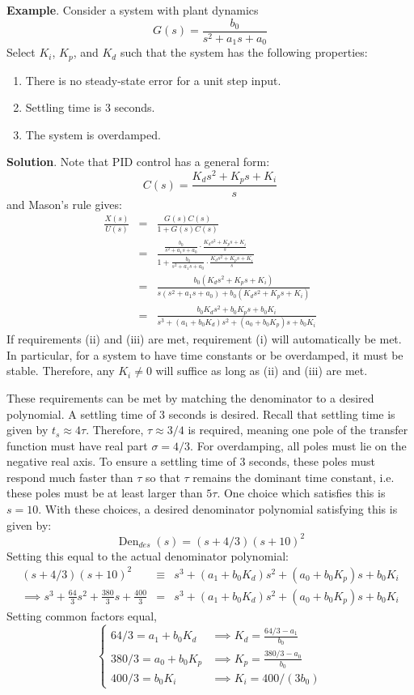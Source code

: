 \begin{framed}
    \textbf{Example}. Consider a system with plant dynamics \[G(s) = \frac{b_0}{s^2+a_1 s + a_0}\] Select $K_i$, $K_p$, and $K_d$ such that the system has the following properties: \vspace{-1em}\begin{enumerate}
        \item[(i)] There is no steady-state error for a unit step input.
        \item[(ii)] Settling time is $3$ seconds.
        \item[(iii)] The system is overdamped.
    \end{enumerate}\vspace{-1em}
    \textbf{Solution}. Note that PID control has a general form: \[C(s) = \frac{K_ds^2+K_p s + K_i}{s}\] and Mason's rule gives: \begin{eqnarray*}
        \frac{X(s)}{U(s)} &=& \frac{G(s)C(s)}{1+G(s)C(s)}\\
        &=& \frac{\frac{b_0}{s^2+a_1s+a_0}\cdot \frac{K_ds^2+K_ps+K_i}{s}}{1+\frac{b_0}{s^2+a_1s+a_0}\cdot \frac{K_ds^2+K_ps+K_i}{s}}\\
        &=& \frac{b_0(K_ds^2+K_ps+K_i)}{s(s^2+a_1s+a_0) + b_0(K_ds^2+K_ps+K_i)}\\
        &=& \frac{b_0K_ds^2+b_0K_ps+b_0K_i}{s^3+(a_1+b_0K_d)s^2+(a_0+b_0K_p)s+b_0K_i}
    \end{eqnarray*}
    If requirements (ii) and (iii) are met, requirement (i) will automatically be met. In particular, for a system to have time constants or be overdamped, it must be stable. Therefore, any $K_i\neq 0$ will suffice as long as (ii) and (iii) are met.

    These requirements can be met by matching the denominator to a desired polynomial. A settling time of $3$ seconds is desired. Recall that settling time is given by $t_s \approx 4\tau$. Therefore, $\tau \approx 3/4$ is required, meaning one pole of the transfer function must have real part $\sigma = 4/3$. For overdamping, all poles must lie on the negative real axis. To ensure a settling time of $3$ seconds, these poles must respond much faster than $\tau$ so that $\tau$ remains the dominant time constant, i.e. these poles must be at least larger than $5\tau$. One choice which satisfies this is $s=10$. With these choices, a desired denominator polynomial satisfying this is given by: \[\operatorname{Den}_{des}(s) = (s+4/3)(s+10)^2\] Setting this equal to the actual denominator polynomial: \begin{eqnarray*}
        (s+4/3)(s+10)^2 &\equiv& s^3+(a_1+b_0K_d)s^2 + (a_0+b_0K_p)s + b_0K_i\\
        \implies s^3+\frac{64}{3}s^2+\frac{380}{3}s+\frac{400}{3} &=& s^3+(a_1+b_0K_d)s^2+(a_0+b_0K_p)s+b_0K_i
    \end{eqnarray*} Setting common factors equal, \[\begin{cases}
        64/3 = a_1+b_0K_d &\implies K_d = \frac{64/3 - a_1}{b_0}\\
        380/3 = a_0+b_0K_p &\implies K_p = \frac{380/3 - a_0}{b_0}\\
        400/3 = b_0K_i &\implies K_i = 400/(3b_0)
    \end{cases}\]
\end{framed}

